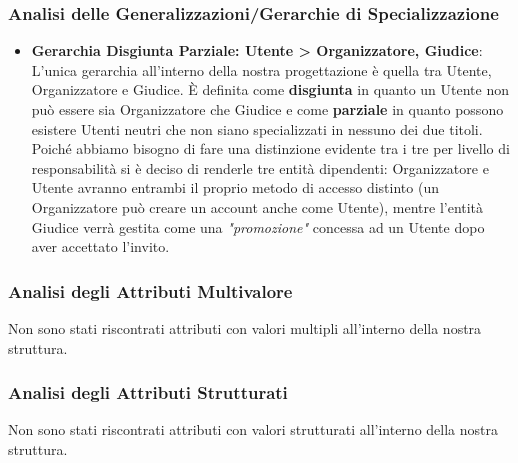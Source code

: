 \documentclass[a4paper, 10pt]{article}
\begin{document}
	\subsubsection{Analisi delle Generalizzazioni/Gerarchie di Specializzazione}
	\begin{itemize}
		\item \textbf{Gerarchia Disgiunta Parziale: Utente > Organizzatore, Giudice}:\\L'unica gerarchia all'interno della nostra progettazione è quella tra Utente, Organizzatore e Giudice. È definita come \textbf{disgiunta} in quanto un Utente non può essere sia Organizzatore che Giudice e come \textbf{parziale} in quanto possono esistere Utenti neutri che non siano specializzati in nessuno dei due titoli. Poiché abbiamo bisogno di fare una distinzione evidente tra i tre per livello di responsabilità si è deciso di renderle tre entità dipendenti: Organizzatore e Utente avranno entrambi il proprio metodo di accesso distinto (un Organizzatore può creare un account anche come Utente), mentre l'entità Giudice verrà gestita come una \textit{"promozione"} concessa ad un Utente dopo aver accettato l'invito. 
	\end{itemize}
	\subsubsection{Analisi degli Attributi Multivalore}
	Non sono stati riscontrati attributi con valori multipli all'interno della nostra struttura.
	\subsubsection{Analisi degli Attributi Strutturati}
	Non sono stati riscontrati attributi con valori strutturati all'interno della nostra struttura.
\end{document}
